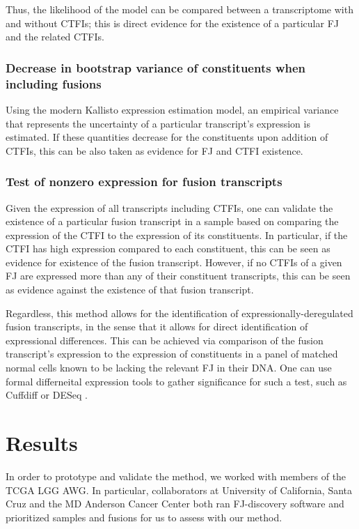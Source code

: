 Thus, the likelihood of the model can be compared between a transcriptome with and without CTFIs; this is direct evidence for the existence of a particular FJ and the related CTFIs.

\subsubsection{Decrease in bootstrap variance of constituents when including fusions}

Using the modern Kallisto\cite{bray_near-optimal_2015} expression estimation model, an empirical variance that represents the uncertainty of a particular transcript's expression is estimated. If these quantities decrease for the constituents upon addition of CTFIs, this can be also taken as evidence for FJ and CTFI existence.

\subsubsection{Test of nonzero expression for fusion transcripts}

Given the expression of all transcripts including CTFIs, one can validate the existence of a particular fusion transcript in a sample based on comparing the expression of the CTFI to the expression of its constituents. In particular, if the CTFI has high expression compared to each constituent, this can be seen as evidence for existence of the fusion transcript. However, if no CTFIs of a given FJ are expressed more than any of their constituent transcripts, this can be seen as evidence against the existence of that fusion transcript.

Regardless, this method allows for the identification of expressionally-deregulated fusion transcripts, in the sense that it allows for direct identification of expressional differences. This can be achieved via comparison of the fusion transcript's expression to the expression of constituents in a panel of matched normal cells known to be lacking the relevant FJ in their DNA. One can use formal differneital expression tools to gather significance for such a test, such as Cuffdiff or DESeq .

\section{Results}

In order to prototype and validate the method, we worked with members of the TCGA LGG AWG. In particular, collaborators at University of California, Santa Cruz and the MD Anderson Cancer Center both ran FJ-discovery software and prioritized samples and fusions for us to assess with our method.

